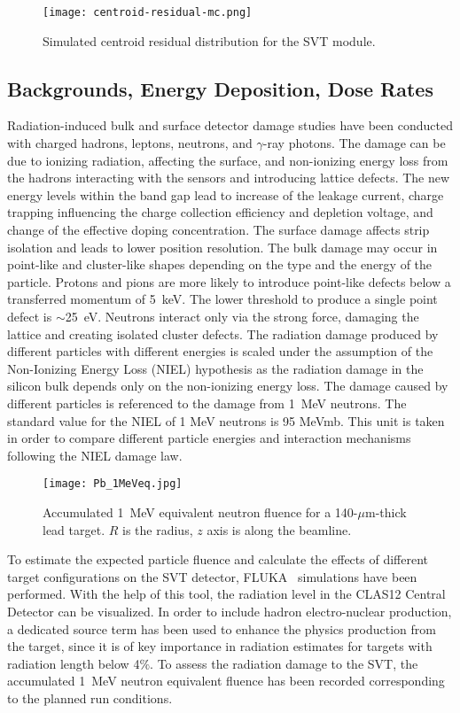 \begin{figure}[hbt]
\texttt{[image: centroid-residual-mc.png]}
\caption{Simulated centroid residual distribution for the SVT module.}
\label{fig:centroid-residual-mc}
\end{figure}

\subsection{Backgrounds, Energy Deposition, Dose Rates}

Radiation-induced bulk and surface detector damage studies have been conducted with charged hadrons, leptons, neutrons, and $\gamma$-ray photons. The damage can be due to ionizing radiation, affecting the surface, and non-ionizing energy loss from the hadrons interacting with the sensors and introducing lattice defects. The new energy levels within the band gap lead to increase of the leakage current, charge trapping influencing the charge collection efficiency and depletion voltage, and change of the effective doping concentration. The surface damage affects strip isolation and leads to lower position resolution. The bulk damage may occur in point-like and cluster-like shapes depending on the type and the energy of the particle. Protons and pions are more likely to introduce point-like defects below a transferred momentum of 5~keV. The lower threshold to produce a single point defect is $\sim$25~eV\cite{ROHE}. Neutrons interact only via the strong force, damaging the lattice and creating isolated cluster defects. The radiation damage produced by different particles with different energies is scaled under the assumption of the Non-Ionizing Energy Loss (NIEL) hypothesis as the radiation damage in the silicon bulk depends only on the non-ionizing energy loss. The damage caused by different particles is referenced to the damage from 1~MeV neutrons. The standard value for the NIEL of 1 MeV neutrons is 95 MeVmb. This unit is taken in order to compare different particle energies and interaction mechanisms following the NIEL damage law.

\begin{figure}[hbt] 
\texttt{[image: Pb\_1MeVeq.jpg]}
\caption{Accumulated 1~MeV equivalent neutron fluence for a 140-$\mu$m-thick lead target. $R$ is the radius, $z$ axis is along the beamline.}
\label{fig:fluka1}
\end{figure}

To estimate the expected particle fluence and calculate the effects of different target configurations on the SVT detector,  FLUKA~\cite{FLUKA1, FLUKA2} simulations have been performed. With the help of this tool, the radiation level in the CLAS12 Central Detector can be visualized. In order to include hadron electro-nuclear production, a dedicated source term has been used to enhance the physics production from the target, since it is of key importance in radiation estimates for targets with radiation length below 4$\%$. To assess the radiation damage to the SVT, the accumulated 1~MeV neutron equivalent fluence has been recorded corresponding to the planned run conditions. 

